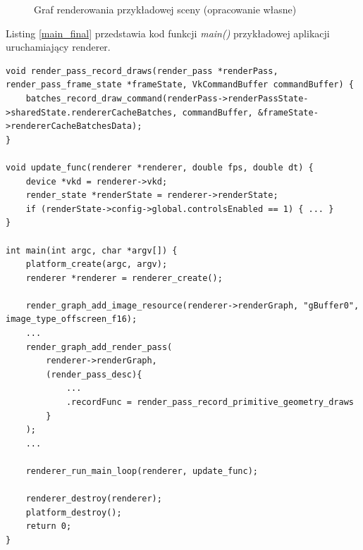 \begin{figure}[H]
	\caption{Graf renderowania przykładowej sceny (opracowanie własne)}
	\label{render_graph_final}
\end{figure}

Listing \ref{main_final} przedstawia kod funkcji \textit{main()} przykładowej aplikacji uruchamiający renderer.
\lstset{language=C}
\begin{lstlisting}[caption={Uruchomienie renderera w funkcji \textit{main()} przykładowej aplikacji},captionpos=b,label={main_final}]
void render_pass_record_draws(render_pass *renderPass, render_pass_frame_state *frameState, VkCommandBuffer commandBuffer) {
	batches_record_draw_command(renderPass->renderPassState->sharedState.rendererCacheBatches, commandBuffer, &frameState->rendererCacheBatchesData);
}

void update_func(renderer *renderer, double fps, double dt) {
	device *vkd = renderer->vkd;
	render_state *renderState = renderer->renderState;
	if (renderState->config->global.controlsEnabled == 1) { ... }
}

int main(int argc, char *argv[]) {
	platform_create(argc, argv);
	renderer *renderer = renderer_create();
	
	render_graph_add_image_resource(renderer->renderGraph, "gBuffer0", image_type_offscreen_f16);
	...
	render_graph_add_render_pass(
		renderer->renderGraph,
		(render_pass_desc){
			...
			.recordFunc = render_pass_record_primitive_geometry_draws
		}
	);
	...
	
	renderer_run_main_loop(renderer, update_func);
	
	renderer_destroy(renderer);
	platform_destroy();
	return 0;
}
\end{lstlisting}

